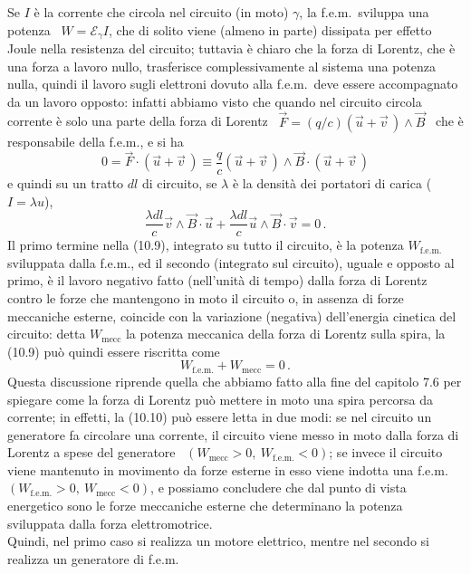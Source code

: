 Se $I$ \`e la corrente che circola nel circuito (in moto) $\gamma$, la
f.e.m.\ sviluppa una potenza \ $W=\mathcal E_\gamma I$, che di solito viene
(almeno in parte) dissipata per effetto Joule nella resistenza del circuito;
tuttavia \`e chiaro che la forza di Lorentz, che \`e una forza a lavoro
nullo, trasferisce complessivamente al sistema una potenza nulla, quindi il
lavoro sugli elettroni dovuto alla f.e.m.\ deve essere accompagnato da un lavoro
opposto: infatti abbiamo visto che quando nel circuito circola corrente \`e solo
una parte della forza di Lorentz \ $\vec F=(q/c)(\vec u+\vec v\,)\wedge\vec B$
\ che \`e responsabile della f.e.m., e si ha
\begin{equation}
  0=\vec F\cdot(\vec u+\vec v\,)
  \equiv\frac{q}{c}(\vec u+\vec v\,)\wedge\vec B\cdot(\vec u+\vec v\,)
  \tag{10.8}
\end{equation}
e quindi su un tratto $dl$ di circuito, se $\lambda$ \`e la densit\`a dei
portatori di carica ($I=\lambda u$),
\begin{equation}
  \frac{\lambda dl}{c}\vec v\wedge\vec B\cdot\vec u
  +\frac{\lambda dl}{c}\vec u\wedge\vec B\cdot\vec v=0\,.
  \tag{10.9}
\end{equation}
Il primo termine nella (10.9), integrato su tutto il circuito, \`e la potenza
$W_\mathrm{f.e.m.}$ sviluppata dalla f.e.m., ed il secondo (integrato sul
circuito), uguale e opposto al primo, \`e il lavoro negativo fatto (nell'unit\`a
di tempo) dalla forza di Lorentz contro le forze che mantengono in moto il
circuito o, in assenza di forze meccaniche esterne, coincide con la variazione
(negativa) dell'energia cinetica del circuito: detta $W_\mathrm{mecc}$ la
potenza meccanica della forza di Lorentz sulla spira, la (10.9) pu\`o quindi
essere riscritta come
\begin{equation}
  W_\mathrm{f.e.m.}+W_\mathrm{mecc}=0\,.
  \tag{10.10}
\end{equation}
Questa discussione riprende quella che abbiamo fatto alla fine del capitolo 7.6
per spiegare come la forza di Lorentz pu\`o mettere in moto una spira percorsa
da corrente; in effetti, la (10.10) pu\`o essere letta in due modi: se nel
circuito un generatore fa circolare una corrente, il circuito viene messo in
moto dalla forza di Lorentz a spese del generatore
\ $(W_\mathrm{mecc}>0,\ W_\mathrm{f.e.m.}<0)$; se invece il circuito viene
mantenuto in movimento da forze esterne in esso viene indotta una
f.e.m.\ $(W_\mathrm{f.e.m.}>0,\ W_\mathrm{mecc}<0)$, e possiamo concludere che
dal punto di vista energetico sono le forze meccaniche esterne che determinano
la potenza sviluppata dalla forza elettromotrice.\\
Quindi, nel primo caso si realizza un motore elettrico, mentre nel secondo si
realizza un generatore di f.e.m.

